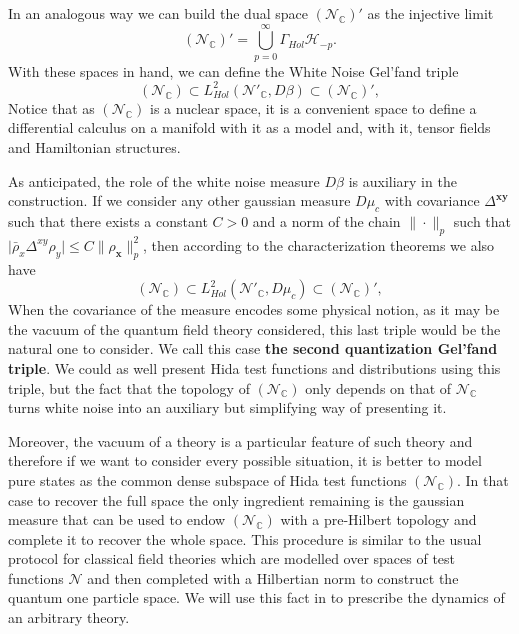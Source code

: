 \documentclass[12pt]{article}%
\begin{document}
In an analogous way we can build the dual space $(\mathcal{N}_{\mathbb{C}})'$ as the injective limit
\begin{equation}
    \label{eq:Hidatestfunctionduak}
    (\mathcal{N}_{\mathbb{C}})'=\bigcup_{p=0}^\infty \Gamma_{Hol} \mathcal{H}_{-p}.
\end{equation}
With these spaces in hand, we can define the  White Noise  Gel'fand triple 
\begin{equation}
\label{eq:Triple_hida}
(\mathcal{N}_{\mathbb{C}})\subset L^2_{Hol}(\mathcal{N}'_{\mathbb{C}}, D\beta)\subset (\mathcal{N}_{\mathbb{C}})',
\end{equation}
  Notice that as $(\mathcal{N}_{\mathbb{C}})$ is a nuclear space, it is a convenient space to define a differential calculus on a manifold with it as a model and, with it, tensor fields and Hamiltonian structures. 

  As anticipated, the role of the white noise measure $D\beta$ is auxiliary in the construction. If we consider any other gaussian measure $D\mu_c$ with covariance $\Delta^{\mathbf{xy}}$ such that there exists a constant $C>0$ and a norm of the chain $\| \cdot \|_p$ such that $\lvert\bar\rho_x\Delta^{xy}\rho_y \rvert \leq C \| \rho_{\mathbf{x}} \|_p^2 $, then according to the characterization theorems \cite{Kondratiev1996} we also have 
  \begin{equation}
    \label{eq:Triple_hida_second}
    (\mathcal{N}_{\mathbb{C}})\subset L^2_{Hol}(\mathcal{N}'_{\mathbb{C}}, D\mu_c)\subset (\mathcal{N}_{\mathbb{C}})',
    \end{equation}
When the covariance of the measure encodes  some physical notion, as it may be the vacuum of the quantum field theory considered, this last triple would be the natural one to consider. We call this case \textbf{the second quantization Gel'fand triple}. We could as well present Hida test functions and distributions using this triple, but the fact that the topology of $(\mathcal{N}_{\mathbb{C}})$ only depends on that of $\mathcal{N}_{\mathbb{C}}$ turns  white noise into an auxiliary but simplifying way of presenting it.

Moreover, the vacuum of a theory is a particular feature of such theory and therefore if we want to consider every possible situation, it is better to model pure states as the common dense subspace of Hida test functions $(\mathcal{N}_{\mathbb{C}})$. In that case to recover the full space the only ingredient remaining is the gaussian measure that can be used to endow $(\mathcal{N}_{\mathbb{C}})$ with a pre-Hilbert topology and complete it to recover the whole space. This procedure is similar to the usual protocol for classical field theories which are modelled over spaces of test functions $\mathcal{N}$ and then completed with a Hilbertian norm to construct the quantum one particle space. We will use this fact in \cite{alonso2023a} to prescribe the dynamics of an arbitrary theory.  
\end{document}
